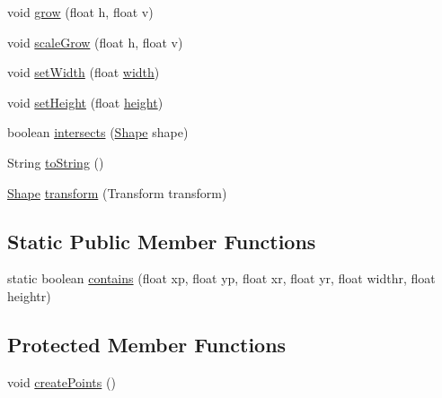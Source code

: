 \begin{DoxyCompactItemize}
\item 
void \mbox{\hyperlink{classorg_1_1newdawn_1_1slick_1_1geom_1_1_rectangle_a0d5625456b48b72e4b09514d597edcf4}{grow}} (float h, float v)
\item 
void \mbox{\hyperlink{classorg_1_1newdawn_1_1slick_1_1geom_1_1_rectangle_af4d484d7d6083833ff7e793279000502}{scale\+Grow}} (float h, float v)
\item 
void \mbox{\hyperlink{classorg_1_1newdawn_1_1slick_1_1geom_1_1_rectangle_a07dc8f2787f4c6d5dfc03fdda3e7d961}{set\+Width}} (float \mbox{\hyperlink{classorg_1_1newdawn_1_1slick_1_1geom_1_1_rectangle_a967e1823f62daf45abb142779d1be62d}{width}})
\item 
void \mbox{\hyperlink{classorg_1_1newdawn_1_1slick_1_1geom_1_1_rectangle_a0f92d7c72369d28e09ae194b04119e26}{set\+Height}} (float \mbox{\hyperlink{classorg_1_1newdawn_1_1slick_1_1geom_1_1_rectangle_a3bd010fdce636fc11ed0e0ad4d4b4a0a}{height}})
\item 
boolean \mbox{\hyperlink{classorg_1_1newdawn_1_1slick_1_1geom_1_1_rectangle_a035c0f753634769b62252fd634342b6f}{intersects}} (\mbox{\hyperlink{classorg_1_1newdawn_1_1slick_1_1geom_1_1_shape}{Shape}} shape)
\item 
String \mbox{\hyperlink{classorg_1_1newdawn_1_1slick_1_1geom_1_1_rectangle_a4ed2e7ffbb3c8b9ca4d4afc47a8f194d}{to\+String}} ()
\item 
\mbox{\hyperlink{classorg_1_1newdawn_1_1slick_1_1geom_1_1_shape}{Shape}} \mbox{\hyperlink{classorg_1_1newdawn_1_1slick_1_1geom_1_1_rectangle_a5036f16c079c7357f80030bf73b41983}{transform}} (Transform transform)
\end{DoxyCompactItemize}
\subsection*{Static Public Member Functions}
\begin{DoxyCompactItemize}
\item 
static boolean \mbox{\hyperlink{classorg_1_1newdawn_1_1slick_1_1geom_1_1_rectangle_a98804c198f5ebeea4325a3a83665d30b}{contains}} (float xp, float yp, float xr, float yr, float widthr, float heightr)
\end{DoxyCompactItemize}
\subsection*{Protected Member Functions}
\begin{DoxyCompactItemize}
\item 
void \mbox{\hyperlink{classorg_1_1newdawn_1_1slick_1_1geom_1_1_rectangle_aa613d96646aad67c6879fd9c380a563e}{create\+Points}} ()
\end{DoxyCompactItemize}
